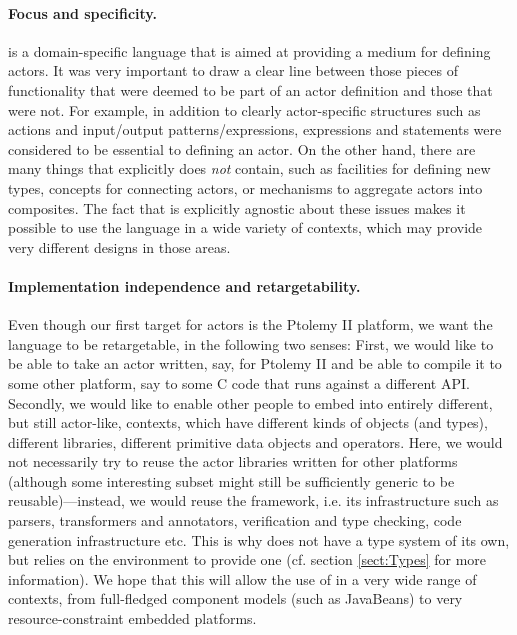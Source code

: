 \paragraph{Focus and specificity.} \Cal is a domain-specific
language that is aimed at providing a medium for defining actors. It
was very important to draw a clear line between those pieces of
functionality that were deemed to be part of an actor definition and
those that were not. For example, in addition to clearly
actor-specific structures such as actions and input/output
patterns/expressions, expressions and statements were considered to be
essential to defining an actor. On the other hand, there are many
things that \Cal explicitly does {\em not} contain, such as facilities
for defining new types, concepts for connecting actors, or mechanisms
to aggregate actors into composites. The fact that \Cal is explicitly
agnostic about these issues makes it possible to use the language in a
wide variety of contexts, which may provide very different designs in
those areas.

\paragraph{Implementation independence and retargetability.} Even
though our first target for \Cal actors is the Ptolemy II
platform, we want the language to be retargetable, in the following
two senses: First, we would like to be able to take an actor written,
say, for Ptolemy II and be able to compile it to some other platform,
say to some C code that runs against a different API. Secondly, we
would like to enable other people to embed \Cal into entirely
different, but still actor-like, contexts, which have different kinds
of objects (and types), different libraries, different primitive data
objects and operators. Here, we would not necessarily try to reuse the
actor libraries written for other platforms (although some interesting
subset might still be sufficiently generic to be reusable)---instead,
we would reuse the \Cal framework, i.e. its infrastructure such as
parsers, transformers and annotators, verification and type checking,
code generation infrastructure etc. This is why \Cal does not have
a type system of its own, but relies on the environment to provide one
(cf. section \ref{sect:Types} for more information). We hope that this
will allow the use of \Cal in a very wide range of contexts, from
full-fledged component models (such as JavaBeans) to very
resource-constraint embedded platforms.

